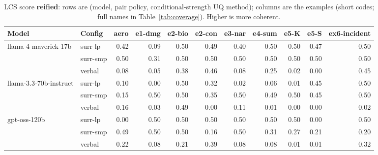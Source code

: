 \documentclass[11pt]{article}
\begin{document}
\begin{table}[htbp]
\centering
\footnotesize
\setlength{\tabcolsep}{3.5pt}
\caption{LCS score \textbf{reified}: rows are (model, pair policy, conditional-strength UQ method); columns are the examples (short codes; full names in Table~\ref{tab:coverage}). Higher is more coherent.}
\label{tab:reified}
\begin{tabular}{llrrrrrrrrr}
\toprule
\textbf{Model} & \textbf{Config} & \textbf{aero} & \textbf{e1-dmg} & \textbf{e2-bio} & \textbf{e2-con} & \textbf{e3-nar} & \textbf{e4-sum} & \textbf{e5-K} & \textbf{e5-S} & \textbf{ex6-incident} \\
\midrule
llama-4-maverick-17b & surr-lp & 0.42 & 0.09 & 0.50 & 0.49 & 0.40 & 0.50 & 0.50 & 0.47 & 0.50 \\
 & surr-smp & 0.50 & 0.31 & 0.50 & 0.50 & 0.50 & 0.50 & 0.50 & 0.50 & 0.50 \\
 & verbal & 0.08 & 0.05 & 0.38 & 0.46 & 0.08 & 0.25 & 0.02 & 0.00 & 0.45 \\
\midrule
llama-3.3-70b-instruct & surr-lp & 0.10 & 0.00 & 0.50 & 0.32 & 0.02 & 0.06 & 0.01 & 0.45 & 0.50 \\
 & surr-smp & 0.15 & 0.50 & 0.50 & 0.35 & 0.50 & 0.49 & 0.50 & 0.45 & 0.50 \\
 & verbal & 0.16 & 0.03 & 0.49 & 0.00 & 0.11 & 0.01 & 0.00 & 0.00 & 0.02 \\
\midrule
gpt-oss-120b & surr-lp & 0.00 & 0.50 & 0.50 & 0.50 & 0.50 & 0.50 & 0.50 & 0.00 & 0.50 \\
 & surr-smp & 0.49 & 0.50 & 0.50 & 0.16 & 0.50 & 0.31 & 0.27 & 0.21 & 0.20 \\
 & verbal & 0.22 & 0.08 & 0.21 & 0.39 & 0.08 & 0.08 & 0.01 & 0.01 & 0.32 \\
\bottomrule
\end{tabular}
\end{table}
\end{document}
